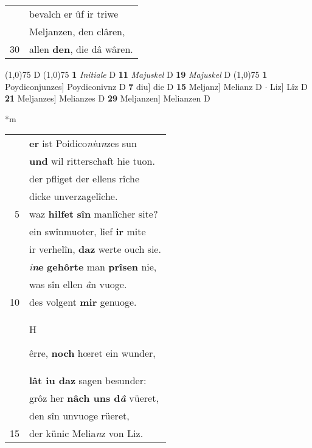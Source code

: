 \documentclass[8pt,a4paper,notitlepage]{article}
\begin{document}
\begin{table}[ht]
\begin{minipage}[t]{0.5\linewidth}
\begin{tabular}{rl}
 & bevalch er ûf ir triwe\\ 
 & Meljanzen, den clâren,\\ 
30 & allen \textbf{den}, die dâ wâren.\\ 
\end{tabular}
\scriptsize
\line(1,0){75} \newline
D \newline
\line(1,0){75} \newline
\textbf{1} \textit{Initiale} D  \textbf{11} \textit{Majuskel} D  \textbf{19} \textit{Majuskel} D  \newline
\line(1,0){75} \newline
\textbf{1} Poydiconjunzes] Poydiconivnz D \textbf{7} diu] die D \textbf{15} Meljanz] Melianz D  $\cdot$ Liz] Lîz D \textbf{21} Meljanzes] Melianzes D \textbf{29} Meljanzen] Melianzen D \newline
\end{minipage}
\hspace{0.5cm}
\begin{minipage}[t]{0.5\linewidth}
\small
\begin{center}*m
\end{center}
\begin{tabular}{rl}
 & \textbf{er} ist Poidico\textit{ni}u\textit{n}zes sun\\ 
 & \textbf{und} wil ritterschaft hie tuon.\\ 
 & der pfliget der ellens rîche\\ 
 & dicke unverzagelîche.\\ 
5 & waz \textbf{hilfet} \textbf{sîn} manlîcher site?\\ 
 & ein swînmuoter, lief \textbf{ir} mite\\ 
 & ir verhelîn, \textbf{daz} werte ouch sie.\\ 
 & \textit{i}\textbf{\textit{n}e} \textbf{gehôrte} man \textbf{prîsen} nie,\\ 
 & was sîn ellen \textit{â}n vuoge.\\ 
10 & des volgent \textbf{mir} genuoge.\\ 
 & \begin{large}H\end{large}êrre, \textbf{noch} hœret ein wunder,\\ 
 & \textbf{lât iu daz} sagen besunder:\\ 
 & grôz her \textbf{nâch uns d\textit{â}} vüeret,\\ 
 & den sîn unvuoge rüeret,\\ 
15 & der künic Melia\textit{n}z von Liz.\\ 

\end{tabular}
\end{minipage}
\end{table}
\end{document}
